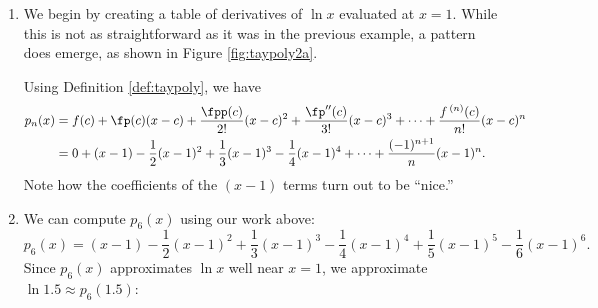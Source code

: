 {\begin{enumerate}
\item		We begin by creating a table of derivatives of $\ln x$ evaluated at $x=1$. While this is not as straightforward as it was in the previous example, a pattern does emerge, as shown in Figure \ref{fig:taypoly2a}.

Using Definition \ref{def:taypoly}, we have \small
\begin{align*}
	p_n(x) &=	f(c) + \fp(c)(x-c) + \frac{\fpp(c)}{2!}(x-c)^2+\frac{\fp''(c)}{3!}(x-c)^3+\cdots+\frac{f\,^{(n)}(c)}{n!}(x-c)^n\\
					&= 0+(x-1)-\frac12(x-1)^2+\frac13(x-1)^3-\frac14(x-1)^4+\cdots+\frac{(-1)^{n+1}}{n}(x-1)^n.
\end{align*}
\normalsize
Note how the coefficients of the $(x-1)$ terms turn out to be ``nice.''

\item		We can compute $p_6(x)$ using our work above:
\[
p_6(x) = (x-1)-\frac12(x-1)^2+\frac13(x-1)^3-\frac14(x-1)^4+\frac15(x-1)^5-\frac16(x-1)^6.
\]
Since $p_6(x)$ approximates $\ln x$ well near $x=1$, we approximate $\ln 1.5 \approx p_6(1.5)$:


\end{enumerate}}
